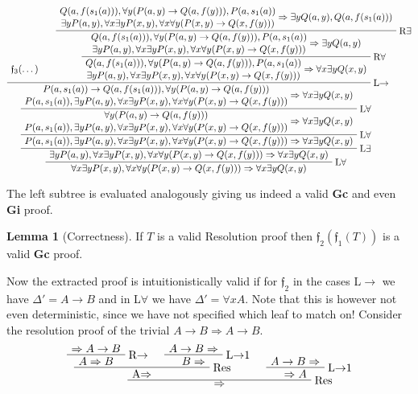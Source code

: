 \documentclass[onehalfspacing]{article}
\theoremstyle{definition}
\theoremstyle{definition}
\theoremstyle{definition}
\newtheorem{lemma}[theorem]{Lemma}
\theoremstyle{definition}
\theoremstyle{definition}
\theoremstyle{definition}
\newcommand{\Gc}{\textbf{Gc}\xspace}
\newcommand{\Gi}{\textbf{Gi}\xspace}
\begin{document}
$$\AxiomC{$\mathfrak f_3(\dots)$}\AxiomC{$\stackanchor{$Q(a, f(s_1(a))), \forall y(P(a, y)\to Q(a, f(y))), P(a, s_1(a))$}{$\exists yP(a, y),\forall x\exists y P(x, y),\forall x\forall y(P(x, y) \to Q(x, f(y)))$}\Rightarrow \exists y Q(a, y), Q(a, f(s_1(a)))$}\RightLabel{R$\exists$}\UnaryInfC{$\stackanchor{$Q(a, f(s_1(a))), \forall y(P(a, y)\to Q(a, f(y))), P(a, s_1(a))$}{$\exists yP(a, y),\forall x\exists y P(x, y),\forall x\forall y(P(x, y) \to Q(x, f(y)))$}\Rightarrow \exists y Q(a, y)$}\RightLabel{R$\forall$}\UnaryInfC{$\stackanchor{$Q(a, f(s_1(a))), \forall y(P(a, y)\to Q(a, f(y))), P(a, s_1(a))$}{$\exists yP(a, y),\forall x\exists y P(x, y),\forall x\forall y(P(x, y) \to Q(x, f(y)))$}\Rightarrow \forall x\exists y Q(x, y)$}\RightLabel{L$\to$}\BinaryInfC{$\stackanchor{$P(a, s_1(a))\to Q(a, f(s_1(a))),\forall y(P(a, y)\to Q(a, f(y)))$}{$P(a, s_1(a)), \exists yP(a, y),\forall x\exists y P(x, y),\forall x\forall y(P(x, y) \to Q(x, f(y)))$}\Rightarrow \forall x\exists y Q(x, y)$}\RightLabel{L$\forall$}\UnaryInfC{$\stackanchor{$\forall y(P(a, y)\to Q(a, f(y)))$}{$P(a, s_1(a)), \exists yP(a, y),\forall x\exists y P(x, y),\forall x\forall y(P(x, y) \to Q(x, f(y)))$}\Rightarrow \forall x\exists y Q(x, y)$}\RightLabel{L$\forall$}\UnaryInfC{$P(a, s_1(a)), \exists yP(a, y),\forall x\exists y P(x, y),\forall x\forall y(P(x, y) \to Q(x, f(y)))\Rightarrow \forall x\exists y Q(x, y)$}\RightLabel{L$\exists$}\UnaryInfC{$\exists yP(a, y),\forall x\exists y P(x, y),\forall x\forall y(P(x, y) \to Q(x, f(y)))\Rightarrow \forall x\exists y Q(x, y)$}\RightLabel{L$\forall$}\UnaryInfC{$\forall x\exists y P(x, y),\forall x\forall y(P(x, y) \to Q(x, f(y)))\Rightarrow \forall x\exists y Q(x, y)$}\DisplayProof$$

The left subtree is evaluated analogously giving us indeed a valid \Gc and even \Gi proof.

\begin{lemma}[Correctness]
	If $T$ is a valid Resolution proof then $\mathfrak{f}_2(\mathfrak{f}_1(T))$ is a valid \Gc proof.
\end{lemma}

Now the extracted proof is intuitionistically valid if for $\mathfrak{f}_2$ in the cases L$\to$ we have $\Delta' = A\to B$ and in L$\forall$ we have $\Delta' = \forall xA$. Note that this is however not even deterministic, since we have not specified which leaf to match on! Consider the resolution proof of the trivial $A\to B\Rightarrow A\to B$.
$$
\AxiomC{$\Rightarrow A\to B$}
\RightLabel{R$\to$}
\UnaryInfC{$A\Rightarrow B$}
\AxiomC{$A\to B\Rightarrow$}
\RightLabel{L$\to$1}
\UnaryInfC{$B\Rightarrow$}
\RightLabel{Res}
\BinaryInfC{A$\Rightarrow$}
\AxiomC{$A\to B\Rightarrow$}
\RightLabel{L$\to$1}
\UnaryInfC{$\Rightarrow A$}
\RightLabel{Res}
\BinaryInfC{$\Rightarrow$}
\DisplayProof
$$
\end{document}
